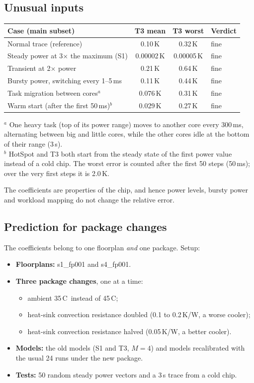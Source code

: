 \documentclass[11pt,a4paper]{article}
\newcommand{\degC}{\,\textdegree C}
\begin{document}
\subsection{Unusual inputs}
\begin{center}
\small
\begin{tabular}{@{}l c c l@{}}
\toprule
Case (main subset) & T3 mean & T3 worst & Verdict \\
\midrule
Normal trace (reference) & 0.10\,K & 0.32\,K & fine \\
Steady power at 3$\times$ the maximum (S1) & 0.00002\,K & 0.00005\,K & fine \\
Transient at 2$\times$ power & 0.21\,K & 0.64\,K & fine \\
Bursty power, switching every 1--5\,ms & 0.11\,K & 0.44\,K & fine \\
Task migration between cores$^{a}$ & 0.076\,K & 0.31\,K & fine \\
Warm start (after the first 50\,ms)$^{b}$ & 0.029\,K & 0.27\,K & fine \\
\bottomrule
\end{tabular}

\smallskip
\begin{minipage}{0.9\linewidth}\footnotesize
$^{a}$ One heavy task (top of its power range) moves to another core every 300\,ms, alternating
between big and little cores, while the other cores idle at the bottom of their range (3\,s).\\
$^{b}$ HotSpot and T3 both start from the steady state of the first power value instead of a cold
chip. The worst error is counted after the first 50 steps (50\,ms); over the very first steps it is
2.0\,K.
\end{minipage}
\end{center}
The coefficients are properties of the chip, and hence power levels, bursty power and workload
mapping do not change the relative error.

\subsection{Prediction for package changes}
The coefficients belong to one floorplan \emph{and} one package. Setup:
\begin{itemize}
  \item \textbf{Floorplans:} s1\_fp001 and s4\_fp001.
  \item \textbf{Three package changes}, one at a time:
  \begin{itemize}
    \item ambient 35\degC\ instead of 45\degC;
    \item heat-sink convection resistance doubled (0.1 to 0.2\,K/W, a worse cooler);
    \item heat-sink convection resistance halved (0.05\,K/W, a better cooler).
  \end{itemize}
  \item \textbf{Models:} the old models (S1 and T3, $M=4$) and models recalibrated with the usual
        24 runs under the new package.
  \item \textbf{Tests:} 50 random steady power vectors and a 3\,s trace from a cold chip.
\end{itemize}
\end{document}
